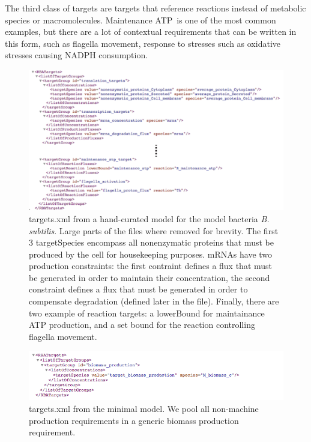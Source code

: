 The third class of targets are targets that reference reactions instead of
metabolic species or macromolecules.
Maintenance ATP is one of the most common examples,
but there are a lot of contextual requirements that can be written in this form,
such as flagella movement,
response to stresses such as oxidative stresses causing NADPH consumption.

\begin{figure}
  \centering
  \includegraphics[scale=0.6]{figures/targets_ex_1}
  \caption{targets.xml from a hand-curated model for the
  model bacteria \textit{B. subtilis}.
  Large parts of the files where removed for brevity.
  The first 3 targetSpecies encompass all nonenzymatic proteins that must be
  produced by the cell for housekeeping purposes.
  mRNAs have two production constraints:
  the first contraint defines a flux that must be generated in order to
  maintain their concentration,
  the second constraint defines a flux that must be generated in order to
  compensate degradation (defined later in the file).
  Finally, there are two example of reaction targets:
  a lowerBound for maintainance ATP production,
  and a set bound for the reaction controlling flagella movement.}
  \label{fig:targets_ex_1}
\end{figure}

\begin{figure}
  \centering
  \includegraphics[scale=0.6]{figures/targets_ex_2}
  \caption{targets.xml from the minimal model.
  We pool all non-machine production requirements in a
  generic biomass production requirement.}
  \label{fig:targets_ex_2}
\end{figure}
